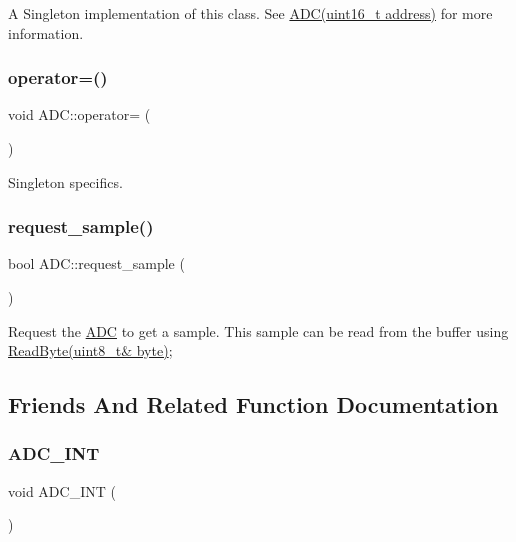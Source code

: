 A Singleton implementation of this class. See \hyperlink{class_a_d_c}{A\+D\+C(uint16\+\_\+t address)} for more information. \hypertarget{class_a_d_c_a8cc7efa85ad7492480bdfd9f49039150}{}\label{class_a_d_c_a8cc7efa85ad7492480bdfd9f49039150} 
\subsubsection{\texorpdfstring{operator=()}{operator=()}}
{\footnotesize\ttfamily void A\+D\+C\+::operator= (\begin{DoxyParamCaption}\item[{const \hyperlink{class_a_d_c}{A\+DC} \&}]{ }\end{DoxyParamCaption})\hspace{0.3cm}{\ttfamily [delete]}}

Singleton specifics. \hypertarget{class_a_d_c_a8264cbf9141f229f5117718e78f01173}{}\label{class_a_d_c_a8264cbf9141f229f5117718e78f01173} 
\subsubsection{\texorpdfstring{request\+\_\+sample()}{request\_sample()}}
{\footnotesize\ttfamily bool A\+D\+C\+::request\+\_\+sample (\begin{DoxyParamCaption}{ }\end{DoxyParamCaption})}

Request the \hyperlink{class_a_d_c}{A\+DC} to get a sample. This sample can be read from the buffer using \hyperlink{class_stream_a6db4180f5834073f992608b856bddca2}{Read\+Byte(uint8\+\_\+t\& byte)}; 

\subsection{Friends And Related Function Documentation}
\hypertarget{class_a_d_c_aa44874a8e770dad4585e5cce5f9d252d}{}\label{class_a_d_c_aa44874a8e770dad4585e5cce5f9d252d} 
\subsubsection{\texorpdfstring{A\+D\+C\+\_\+\+I\+NT}{ADC\_INT}}
{\footnotesize\ttfamily void A\+D\+C\+\_\+\+I\+NT (\begin{DoxyParamCaption}{ }\end{DoxyParamCaption})\hspace{0.3cm}{\ttfamily [friend]}}

